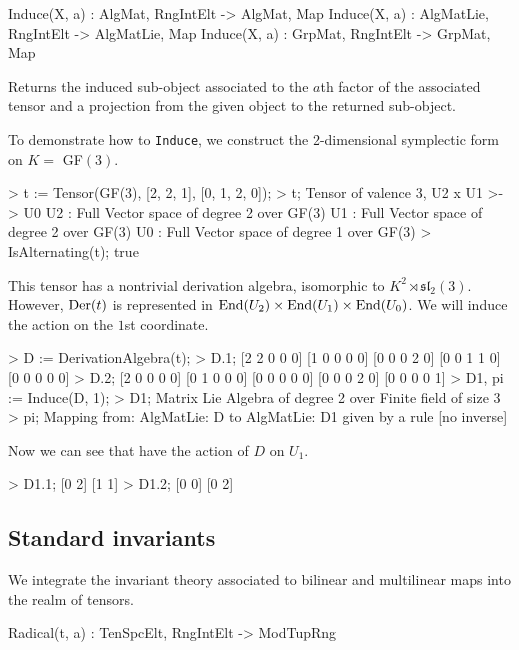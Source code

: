 \begin{intrinsics}
Induce(X, a) : AlgMat, RngIntElt -> AlgMat, Map
Induce(X, a) : AlgMatLie, RngIntElt -> AlgMatLie, Map
Induce(X, a) : GrpMat, RngIntElt -> GrpMat, Map
\end{intrinsics}

Returns the induced sub-object associated to the $a$th factor of the 
associated 
tensor and a projection from the given object to the returned sub-object.

\begin{example}[Inducing]

To demonstrate how to \texttt{Induce}, we construct the 2-dimensional symplectic form on $K =$ GF$(3)$. 
\begin{code}
> t := Tensor(GF(3), [2, 2, 1], [0, 1, 2, 0]);
> t;
Tensor of valence 3, U2 x U1 >-> U0
U2 : Full Vector space of degree 2 over GF(3)
U1 : Full Vector space of degree 2 over GF(3)
U0 : Full Vector space of degree 1 over GF(3)
> IsAlternating(t);
true
\end{code}

This tensor has a nontrivial derivation algebra, isomorphic to $K^2\rtimes \mathfrak{sl}_2(3)$. 
However, $\operatorname{Der}(t)$ is represented in $\operatorname{End}(U_2)\times\operatorname{End}(U_1)\times \operatorname{End}(U_0)$. 
We will induce the action on the $1$st coordinate.
\begin{code}
> D := DerivationAlgebra(t);
> D.1;
[2 2 0 0 0]
[1 0 0 0 0]
[0 0 0 2 0]
[0 0 1 1 0]
[0 0 0 0 0]
> D.2;
[2 0 0 0 0]
[0 1 0 0 0]
[0 0 0 0 0]
[0 0 0 2 0]
[0 0 0 0 1]
> D1, pi := Induce(D, 1);
> D1;
Matrix Lie Algebra of degree 2 over Finite field of size 3
> pi;
Mapping from: AlgMatLie: D to AlgMatLie: D1 given by a rule [no inverse]
\end{code}

Now we can see that have the action of $D$ on $U_1$.
\begin{code}
> D1.1;
[0 2]
[1 1]
> D1.2;
[0 0]
[0 2]
\end{code}
\end{example}



\subsection{Standard invariants}

We integrate the invariant theory associated to bilinear and multilinear maps
into the realm of tensors. 

\begin{intrinsics}
Radical(t, a) : TenSpcElt, RngIntElt -> ModTupRng
\end{intrinsics}

